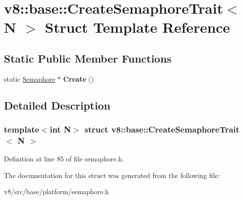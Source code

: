 \hypertarget{structv8_1_1base_1_1CreateSemaphoreTrait}{}\section{v8\+:\+:base\+:\+:Create\+Semaphore\+Trait$<$ N $>$ Struct Template Reference}
\label{structv8_1_1base_1_1CreateSemaphoreTrait}
\subsection*{Static Public Member Functions}
\begin{DoxyCompactItemize}
\item 
\mbox{\label{structv8_1_1base_1_1CreateSemaphoreTrait_a4d3cf2d1ca658f22d5f76a883ab46091}} 
static \mbox{\hyperlink{classv8_1_1base_1_1Semaphore}{Semaphore}} $\ast$ {\bfseries Create} ()
\end{DoxyCompactItemize}


\subsection{Detailed Description}
\subsubsection*{template$<$int N$>$\newline
struct v8\+::base\+::\+Create\+Semaphore\+Trait$<$ N $>$}



Definition at line 85 of file semaphore.\+h.



The documentation for this struct was generated from the following file\+:\begin{DoxyCompactItemize}
\item 
v8/src/base/platform/semaphore.\+h\end{DoxyCompactItemize}
